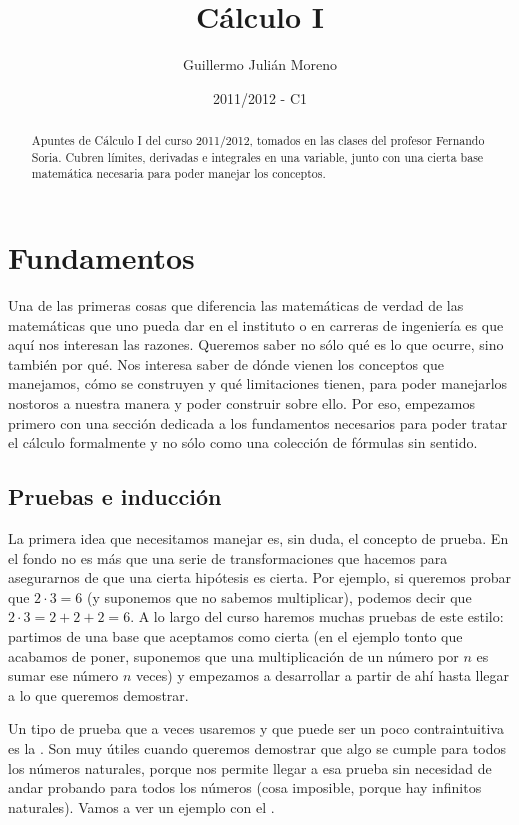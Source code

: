 \documentclass[palatino, nochap]{apuntes}
\author{Guillermo Julián Moreno}
\date{2011/2012 - C1}
\title{Cálculo I}
\begin{document}
\begin{abstract}
Apuntes de Cálculo I del curso 2011/2012, tomados en las clases del profesor Fernando Soria. Cubren límites, derivadas e integrales en una variable, junto con una cierta base matemática necesaria para poder manejar los conceptos.
\end{abstract}

\maketitle
\newpage

\tableofcontents

\newpage

\section{Fundamentos}
\label{sec:Fundamentos}

Una de las primeras cosas que diferencia las matemáticas de verdad de las matemáticas que uno pueda dar en el instituto o en carreras de ingeniería es que aquí nos interesan las razones. Queremos saber no sólo qué es lo que ocurre, sino también por qué. Nos interesa saber de dónde vienen los conceptos que manejamos, cómo se construyen y qué limitaciones tienen, para poder manejarlos nostoros a nuestra manera y poder construir sobre ello. Por eso, empezamos primero con una sección dedicada a los fundamentos necesarios para poder tratar el cálculo formalmente y no sólo como una colección de fórmulas sin sentido.

\subsection{Pruebas e inducción}

La primera idea que necesitamos manejar es, sin duda, el concepto de prueba. En el fondo no es más que una serie de transformaciones que hacemos para asegurarnos de que una cierta hipótesis es cierta. Por ejemplo, si queremos probar que $2 · 3 = 6$ (y suponemos que no sabemos multiplicar), podemos decir que $2·3 = 2 + 2 + 2 = 6$. A lo largo del curso haremos muchas pruebas de este estilo: partimos de una base que aceptamos como cierta (en el ejemplo tonto que acabamos de poner, suponemos que una multiplicación de un número por $n$ es sumar ese número $n$ veces) y empezamos a desarrollar a partir de ahí hasta llegar a lo que queremos demostrar.

Un tipo de prueba que a veces usaremos y que puede ser un poco contraintuitiva es la . Son muy útiles cuando queremos demostrar que algo se cumple para todos los números naturales, porque nos permite llegar a esa prueba sin necesidad de andar probando para todos los números (cosa imposible, porque hay infinitos naturales). Vamos a ver un ejemplo con el .
\end{document}
